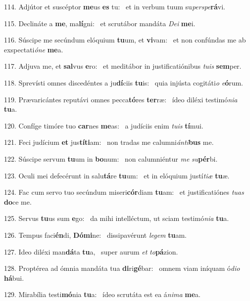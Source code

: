 114. Adjútor et suscéptor \textbf{me}us \textbf{es} tu: \ast\  et in verbum tuum su\textit{per}\textit{spe}\textbf{rá}vi.\

115. Declináte a \textbf{me}, ma\textbf{lí}gni: \ast\  et scrutábor mandáta \textit{De}\textit{i} \textbf{me}i.\

116. Súscipe me secúndum elóquium \textbf{tu}um, et \textbf{vi}vam: \ast\  et non confúndas me ab exspectati\textit{ó}\textit{ne} \textbf{me}a.\

117. Adjuva me, et \textbf{sal}vus \textbf{e}ro: \ast\  et meditábor in justificatiónibus \textit{tu}\textit{is} \textbf{sem}per.\

118. Sprevísti omnes discedéntes a ju\textbf{dí}ciis \textbf{tu}is: \ast\  quia injústa cogitáti\textit{o} \textit{e}\textbf{ó}rum.\

119. Prævaricántes reputávi omnes pecca\textbf{tó}res \textbf{ter}ræ: \ast\  ídeo diléxi testimó\textit{ni}\textit{a} \textbf{tu}a.\

120. Confíge timóre tuo \textbf{car}nes \textbf{me}as: \ast\  a judíciis enim \textit{tu}\textit{is} \textbf{tí}mui.\

121. Feci judícium \textbf{et} jus\textbf{tí}\textbf{ti}am: \ast\  non tradas me calumni\textit{án}\textit{ti}\textbf{bus} me.\

122. Súscipe servum \textbf{tu}um in \textbf{bo}num: \ast\  non calumniéntur \textit{me} \textit{su}\textbf{pér}bi.\

123. Oculi mei defecérunt in salu\textbf{tá}re \textbf{tu}um: \ast\  et in elóquium justí\textit{ti}\textit{æ} \textbf{tu}æ.\

124. Fac cum servo tuo secúndum miseri\textbf{cór}diam \textbf{tu}am: \ast\  et justificatiónes \textit{tu}\textit{as} \textbf{do}ce me.\

125. Servus \textbf{tu}us sum \textbf{e}go: \ast\  da mihi intelléctum, ut sciam testimó\textit{ni}\textit{a} \textbf{tu}a.\

126. Tempus faci\textbf{én}di, \textbf{Dó}\textbf{mi}ne: \ast\  dissipavérunt \textit{le}\textit{gem} \textbf{tu}am.\

127. Ideo diléxi man\textbf{dá}ta \textbf{tu}a, \ast\  super aurum \textit{et} \textit{to}\textbf{pá}zion.\

128. Proptérea ad ómnia mandáta tua \textbf{di}ri\textbf{gé}bar: \ast\  omnem viam iníquam ó\textit{di}\textit{o} \textbf{há}bui.\

129. Mirabília testi\textbf{mó}nia \textbf{tu}a: \ast\  ídeo scrutáta est ea á\textit{ni}\textit{ma} \textbf{me}a.\

